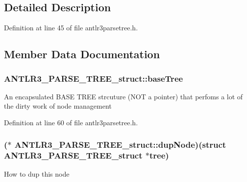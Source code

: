 \subsection{Detailed Description}


Definition at line 45 of file antlr3parsetree.\-h.



\subsection{Member Data Documentation}
\hypertarget{struct_a_n_t_l_r3___p_a_r_s_e___t_r_e_e__struct_adf29cfa8ac886a0292c8ec5e21859a65}{
\subsubsection[{base\-Tree}]{ A\-N\-T\-L\-R3\-\_\-\-P\-A\-R\-S\-E\-\_\-\-T\-R\-E\-E\-\_\-struct\-::base\-Tree}}\label{struct_a_n_t_l_r3___p_a_r_s_e___t_r_e_e__struct_adf29cfa8ac886a0292c8ec5e21859a65}
An encapsulated B\-A\-S\-E T\-R\-E\-E strcuture (N\-O\-T a pointer) that perfoms a lot of the dirty work of node management 

Definition at line 60 of file antlr3parsetree.\-h.

\hypertarget{struct_a_n_t_l_r3___p_a_r_s_e___t_r_e_e__struct_a164cc1d674b62141c5ef0fda35107077}{
\subsubsection[{dup\-Node}]{($\ast$ A\-N\-T\-L\-R3\-\_\-\-P\-A\-R\-S\-E\-\_\-\-T\-R\-E\-E\-\_\-struct\-::dup\-Node)(struct {\bf A\-N\-T\-L\-R3\-\_\-\-P\-A\-R\-S\-E\-\_\-\-T\-R\-E\-E\-\_\-struct} $\ast$tree)}}\label{struct_a_n_t_l_r3___p_a_r_s_e___t_r_e_e__struct_a164cc1d674b62141c5ef0fda35107077}
How to dup this node 

